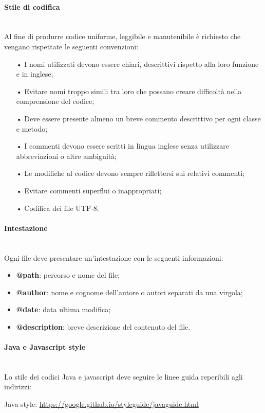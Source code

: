 \paragraph{Stile di codifica}\mbox{}\\
Al fine di produrre codice uniforme, leggibile e manutenibile è richiesto che vengano rispettate
le seguenti convenzioni:
\begin{itemize}
\item[•] I nomi utilizzati devono essere chiari, descrittivi rispetto alla loro funzione e in inglese;
\item[•] Evitare nomi troppo simili tra loro che possano creare difficoltà nella comprensione del codice;
\item[•] Deve essere presente almeno un breve commento descrittivo per ogni classe e metodo;
\item[•] I commenti devono essere scritti in lingua inglese senza utilizzare abbreviazioni o altre ambiguità;
\item[•] Le modifiche al codice devono sempre riflettersi sui relativi commenti;
\item[•] Evitare commenti superflui o  inappropriati;
\item[•] Codifica dei file UTF-8.
\end{itemize}

\paragraph{Intestazione}\mbox{}\\
Ogni file deve presentare un'intestazione con le seguenti informazioni:
\begin{itemize}
\item \textbf{@path}: percorso e nome del file;
\item \textbf{@author}: nome e cognome dell'autore o autori separati da una virgola;
\item \textbf{@date}: data ultima modifica;
\item \textbf{@description}: breve descrizione del contenuto del file.
\end{itemize}

\paragraph{Java e Javascript style}\mbox{}\\
Lo stile dei codici Java e javascript deve seguire le linee guida reperibili agli indirizzi:\\
\begin{center}
Java style: \url{https://google.github.io/styleguide/javaguide.html}
\end{center}

